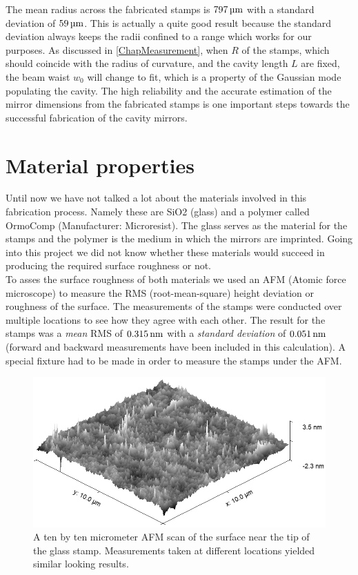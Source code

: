 The mean radius across the fabricated stamps is $797\um$ with a standard deviation of $59\um$. This is actually a quite good result because the standard deviation always keeps the radii confined to a range which works for our purposes. As discussed in \autoref{ChapMeasurement}, when $R$ of the stamps, which should coincide with the radius of curvature, and the cavity length $L$ are fixed, the beam waist $w_0$ will change to fit, which is a property of the Gaussian mode populating the cavity. The high reliability and the accurate estimation of the mirror dimensions from the fabricated stamps is one important steps towards the successful fabrication of the cavity mirrors.

\section{Material properties}\label{ChapMatProp}
Until now we have not talked a lot about the materials involved in this fabrication process. Namely these are SiO2 (glass) and a polymer called OrmoComp (Manufacturer: Microresist). The glass serves as the material for the stamps and the polymer is the medium in which the mirrors are imprinted. Going into this project we did not know whether these materials would succeed in producing the required surface roughness or not.\\
To asses the surface roughness of both materials we used an AFM (Atomic force microscope) to measure the RMS (root-mean-square) height deviation or roughness of the surface. The measurements of the stamps were conducted over multiple locations to see how they agree with each other. The result for the stamps was a \textit{mean} RMS of $0.315\nm$ with a \textit{standard deviation} of $0.051\nm$ (forward and backward measurements have been included in this calculation). A special fixture had to be made in order to measure the stamps under the AFM.\\
\begin{figure}[H]
	\includegraphics[scale=0.5]{source/stamp_rms}
	\caption{A ten by ten micrometer AFM scan of the surface near the tip of the glass stamp. Measurements taken at different locations yielded similar looking results.}
\end{figure}
